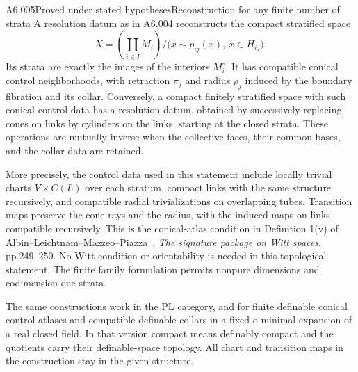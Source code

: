 \begin{saresult}{A6.005}{Proved under stated hypotheses}{Reconstruction for any finite number of strata}
A resolution datum as in A6.004 reconstructs the compact stratified
space
\[
 X=\left(\coprod_{i\in I}M_i\right)\big/
 \bigl(x\sim p_{ij}(x),\ x\in H_{ij}\bigr).
\]
Its strata are exactly the images of the interiors $M_i^\circ$.
It has compatible conical control neighborhoods, with retraction
$\pi_j$ and radius $\rho_j$ induced by the boundary fibration and
its collar. Conversely, a compact finitely stratified space with
such conical control data has a resolution datum, obtained by
successively replacing cones on links by cylinders on the links,
starting at the closed strata. These operations are mutually inverse
when the collective faces, their common bases, and the collar data
are retained.

More precisely, the control data used in this statement include
locally trivial charts $V\times C(L)$ over each stratum, compact
links with the same structure recursively, and compatible radial
trivializations on overlapping tubes. Transition maps preserve
the cone rays and the radius, with the induced maps on links
compatible recursively. This is the conical-atlas condition in
Definition 1(v) of Albin--Leichtnam--Mazzeo--Piazza~\cite{ALMP2012},
\emph{The signature package on Witt spaces}, pp.249--250.
No Witt condition or orientability is needed in this topological
statement. The finite family formulation permits nonpure dimensions
and codimension-one strata.

The same constructions work in the PL category, and for finite
definable conical control atlases and compatible definable collars
in a fixed o-minimal expansion of a real closed field. In that
version compact means definably compact and the quotients carry
their definable-space topology. All chart and transition maps in
the construction stay in the given structure.
\end{saresult}
